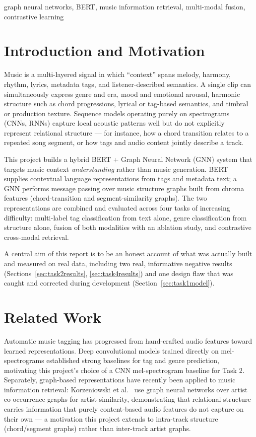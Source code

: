 \documentclass[conference]{IEEEtran}
\begin{document}
\begin{IEEEkeywords}
graph neural networks, BERT, music information retrieval, multi-modal fusion, contrastive learning
\end{IEEEkeywords}

\section{Introduction and Motivation}
Music is a multi-layered signal in which ``context'' spans melody, harmony, rhythm, lyrics, metadata tags, and listener-described semantics. A single clip can simultaneously express genre and era, mood and emotional arousal, harmonic structure such as chord progressions, lyrical or tag-based semantics, and timbral or production texture. Sequence models operating purely on spectrograms (CNNs, RNNs) capture local acoustic patterns well but do not explicitly represent relational structure --- for instance, how a chord transition relates to a repeated song segment, or how tags and audio content jointly describe a track.

This project builds a hybrid BERT + Graph Neural Network (GNN) system that targets music context \emph{understanding} rather than music generation. BERT supplies contextual language representations from tags and metadata text; a GNN performs message passing over music structure graphs built from chroma features (chord-transition and segment-similarity graphs). The two representations are combined and evaluated across four tasks of increasing difficulty: multi-label tag classification from text alone, genre classification from structure alone, fusion of both modalities with an ablation study, and contrastive cross-modal retrieval.

A central aim of this report is to be an honest account of what was actually built and measured on real data, including two real, informative negative results (Sections~\ref{sec:task2results}, \ref{sec:task4results}) and one design flaw that was caught and corrected during development (Section~\ref{sec:task1model}).

\section{Related Work}
Automatic music tagging has progressed from hand-crafted audio features toward learned representations. Deep convolutional models trained directly on mel-spectrograms established strong baselines for tag and genre prediction, motivating this project's choice of a CNN mel-spectrogram baseline for Task 2. Separately, graph-based representations have recently been applied to music information retrieval: Korzeniowski et al.~\cite{gnn_mir} use graph neural networks over artist co-occurrence graphs for artist similarity, demonstrating that relational structure carries information that purely content-based audio features do not capture on their own --- a motivation this project extends to intra-track structure (chord/segment graphs) rather than inter-track artist graphs.
\end{document}
